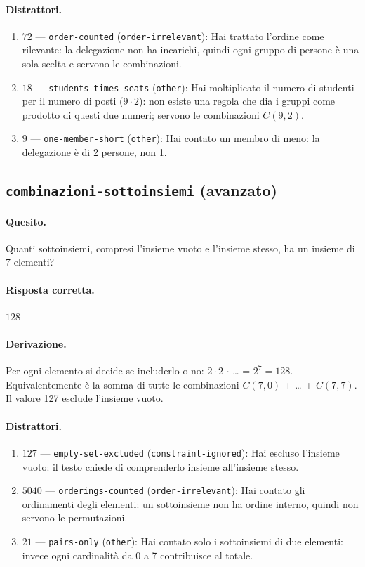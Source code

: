 \paragraph{Distrattori.}
\begin{enumerate}
  \item $72$ --- \texttt{order-counted} (\texttt{order-irrelevant}): Hai trattato l'ordine come rilevante: la delegazione non ha incarichi, quindi ogni gruppo di persone è una sola scelta e servono le combinazioni.
  \item $18$ --- \texttt{students-times-seats} (\texttt{other}): Hai moltiplicato il numero di studenti per il numero di posti ($9 \cdot  2$): non esiste una regola che dia i gruppi come prodotto di questi due numeri; servono le combinazioni $C(9,2)$.
  \item $9$ --- \texttt{one-member-short} (\texttt{other}): Hai contato un membro di meno: la delegazione è di 2 persone, non 1.
\end{enumerate}

\subsection{\texorpdfstring{\texttt{combinazioni-sottoinsiemi} (avanzato)}{combinazioni-sottoinsiemi (avanzato)}}

\paragraph{Quesito.} Quanti sottoinsiemi, compresi l'insieme vuoto e l'insieme stesso, ha un insieme di 7 elementi?

\paragraph{Risposta corretta.} $128$

\paragraph{Derivazione.} Per ogni elemento si decide se includerlo o no: $2 \cdot  2$ $\cdot$ \ldots{} = $2^{7} = 128$. Equivalentemente è la somma di tutte le combinazioni $C(7,0)$ + \ldots{} + $C(7,7)$. Il valore 127 esclude l'insieme vuoto.

\paragraph{Distrattori.}
\begin{enumerate}
  \item $127$ --- \texttt{empty-set-excluded} (\texttt{constraint-ignored}): Hai escluso l'insieme vuoto: il testo chiede di comprenderlo insieme all'insieme stesso.
  \item $5040$ --- \texttt{orderings-counted} (\texttt{order-irrelevant}): Hai contato gli ordinamenti degli elementi: un sottoinsieme non ha ordine interno, quindi non servono le permutazioni.
  \item $21$ --- \texttt{pairs-only} (\texttt{other}): Hai contato solo i sottoinsiemi di due elementi: invece ogni cardinalità da 0 a 7 contribuisce al totale.
\end{enumerate}

